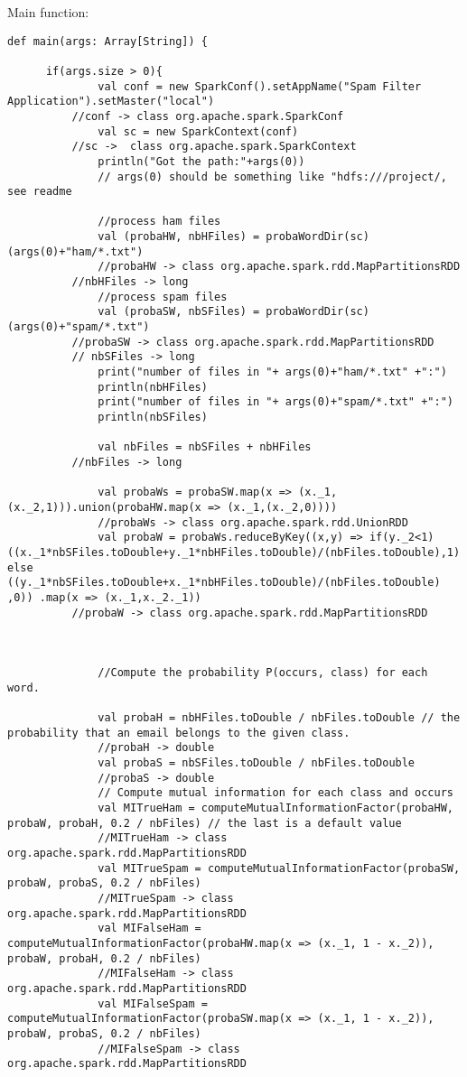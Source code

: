 \documentclass[paper=a4, fontsize=11pt]{scrartcl}
\numberwithin{equation}{section}		%
\numberwithin{figure}{section}			%
\numberwithin{table}{section}				%
\begin{document}
Main function:
\begin{lstlisting}
def main(args: Array[String]) {

      if(args.size > 0){
              val conf = new SparkConf().setAppName("Spam Filter Application").setMaster("local")
	      //conf -> class org.apache.spark.SparkConf
              val sc = new SparkContext(conf)
	      //sc ->  class org.apache.spark.SparkContext
              println("Got the path:"+args(0))
              // args(0) should be something like "hdfs:///project/, see readme

              //process ham files
              val (probaHW, nbHFiles) = probaWordDir(sc)(args(0)+"ham/*.txt")
              //probaHW -> class org.apache.spark.rdd.MapPartitionsRDD
	      //nbHFiles -> long
              //process spam files
              val (probaSW, nbSFiles) = probaWordDir(sc)(args(0)+"spam/*.txt")
	      //probaSW -> class org.apache.spark.rdd.MapPartitionsRDD
	      // nbSFiles -> long
              print("number of files in "+ args(0)+"ham/*.txt" +":")
              println(nbHFiles)
              print("number of files in "+ args(0)+"spam/*.txt" +":")
              println(nbSFiles)

              val nbFiles = nbSFiles + nbHFiles
	      //nbFiles -> long
             
              val probaWs = probaSW.map(x => (x._1,(x._2,1))).union(probaHW.map(x => (x._1,(x._2,0))))
              //probaWs -> class org.apache.spark.rdd.UnionRDD
              val probaW = probaWs.reduceByKey((x,y) => if(y._2<1) ((x._1*nbSFiles.toDouble+y._1*nbHFiles.toDouble)/(nbFiles.toDouble),1) else ((y._1*nbSFiles.toDouble+x._1*nbHFiles.toDouble)/(nbFiles.toDouble) ,0)) .map(x => (x._1,x._2._1))
 	      //probaW -> class org.apache.spark.rdd.MapPartitionsRDD



              //Compute the probability P(occurs, class) for each word.

              val probaH = nbHFiles.toDouble / nbFiles.toDouble // the probability that an email belongs to the given class.
              //probaH -> double
              val probaS = nbSFiles.toDouble / nbFiles.toDouble
              //probaS -> double
              // Compute mutual information for each class and occurs
              val MITrueHam = computeMutualInformationFactor(probaHW, probaW, probaH, 0.2 / nbFiles) // the last is a default value
              //MITrueHam -> class org.apache.spark.rdd.MapPartitionsRDD
              val MITrueSpam = computeMutualInformationFactor(probaSW, probaW, probaS, 0.2 / nbFiles)
              //MITrueSpam -> class org.apache.spark.rdd.MapPartitionsRDD
              val MIFalseHam = computeMutualInformationFactor(probaHW.map(x => (x._1, 1 - x._2)), probaW, probaH, 0.2 / nbFiles)
              //MIFalseHam -> class org.apache.spark.rdd.MapPartitionsRDD
              val MIFalseSpam = computeMutualInformationFactor(probaSW.map(x => (x._1, 1 - x._2)), probaW, probaS, 0.2 / nbFiles)
              //MIFalseSpam -> class org.apache.spark.rdd.MapPartitionsRDD


\end{lstlisting}
\end{document}
